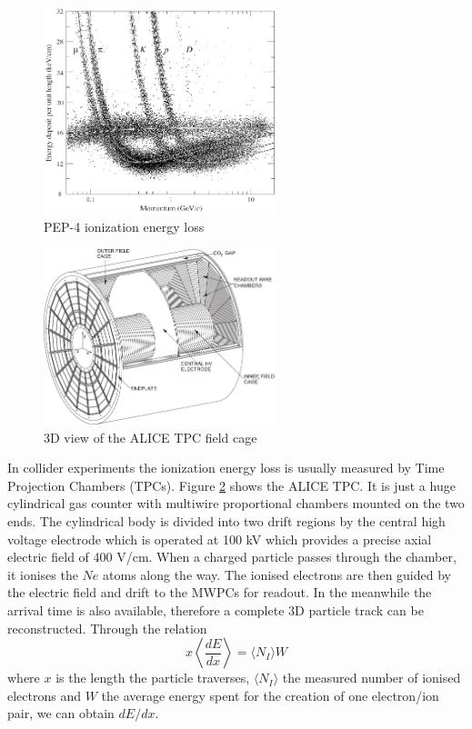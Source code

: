\documentclass[11pt]{article} %
\begin{document}
\begin{figure}
    \centering
    \includegraphics[width=0.6\textwidth]{plots/pep_pid.png}
    \caption{PEP-4 ionization energy loss}
    \label{fig:dEdxpep4}
\end{figure}

\begin{figure}
    \centering
    \includegraphics[width=0.6\textwidth]{plots/ALICE_TPC.pdf}
    \caption{3D view of the ALICE TPC field cage}
    \label{fig:alicetpc}
\end{figure}

In collider experiments the ionization energy loss is usually measured by Time Projection Chambers (TPCs). Figure \ref{fig:alicetpc} shows the ALICE TPC. It is just a huge cylindrical gas counter with multiwire proportional chambers mounted on the two ends. The cylindrical body is divided into two drift regions by the central high voltage electrode which is operated at 100 kV which provides a precise axial electric field of 400 V/cm. When a charged particle passes through the chamber, it ionises the $Ne$ atoms along the way. The ionised electrons are then guided by the electric field and drift to the MWPCs for readout. In the meanwhile the arrival time is also available, therefore a complete 3D particle track can be reconstructed. Through the relation
\begin{equation}
x\left\langle\frac{dE}{dx}\right\rangle=\langle N_I\rangle W
\end{equation}
where $x$ is the length the particle traverses, $\langle N_I\rangle$ the measured number of ionised electrons and $W$ the average energy spent for the creation of one electron/ion pair, we can obtain $dE/dx$.
\end{document}
